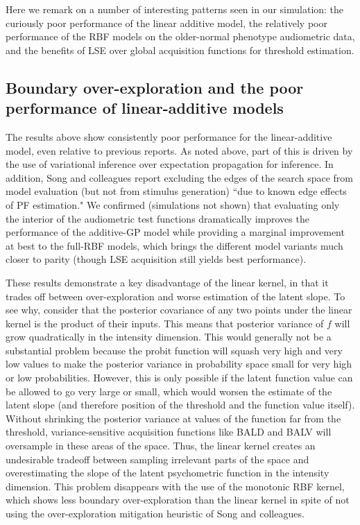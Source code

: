 \documentclass[../main.tex]{subfiles}
\begin{document}
Here we remark on a number of interesting patterns seen in our simulation: the curiously poor performance of the linear additive model, the relatively poor performance of the RBF models on the older-normal phenotype audiometric data, and the benefits of LSE over global acquisition functions for threshold estimation.

\subsection{Boundary over-exploration and the poor performance of linear-additive models}

The results above show consistently poor performance for the linear-additive model, even relative to previous reports. As noted above, part of this is driven by the use of variational inference over expectation propagation for inference. In addition, Song and colleagues report excluding the edges of the search space from model evaluation (but not from stimulus generation) ``due to known edge effects of PF estimation." We confirmed (simulations not shown) that evaluating only the interior of the audiometric test functions dramatically improves the performance of the additive-GP model while providing a marginal improvement at best to the full-RBF models, which brings the different model variants much closer to parity (though LSE acquisition still yields best performance).

These results demonstrate a key disadvantage of the linear kernel, in that it trades off between over-exploration and worse estimation of the latent slope. To see why, consider that the posterior covariance of any two points under the linear kernel is the product of their inputs. This means that posterior variance of $f$ will grow quadratically in the intensity dimension. This would generally not be a substantial problem because the probit function will squash very high and very low values to make the posterior variance in probability space small for very high or low probabilities. However, this is only possible if the latent function value can be allowed to go very large or small, which would worsen the estimate of the latent slope (and therefore position of the threshold and the function value itself). Without shrinking the posterior variance at values of the function far from the threshold, variance-sensitive acquisition functions like BALD and BALV will oversample in these areas of the space. Thus, the linear kernel creates an undesirable tradeoff between sampling irrelevant parts of the space and overestimating the slope of the latent psychometric function in the intensity dimension. This problem disappears with the use of the monotonic RBF kernel, which shows less boundary over-exploration than the linear kernel in spite of not using the over-exploration mitigation heuristic of Song and colleagues.
\end{document}
